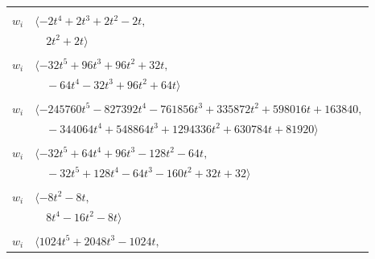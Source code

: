 \documentclass[11pt]{article}
\begin{document}
\begin{longtable}{@{}ll@{}}
\addlinespace[2pt]
\multicolumn{2}{@{}p{0.97\textwidth}@{}}{$i=11$, $D_i=2$, $\rho_{ij}$: $16{:}1, \allowbreak 17{:}2, \allowbreak 19{:}2, \allowbreak 29{:}1, \allowbreak 40{:}1, \allowbreak 43{:}2$}\\
$w_i$ & $\langle -2t^{4}+2t^{3}+2t^{2}-2t,$\\
 & $\quad 2t^{2}+2t\rangle$\\
\addlinespace[2pt]
\multicolumn{2}{@{}p{0.97\textwidth}@{}}{$i=12$, $D_i=32$, $\rho_{ij}$: $0{:}1, \allowbreak 1{:}1, \allowbreak 17{:}2, \allowbreak 28{:}1, \allowbreak 34{:}2, \allowbreak 47{:}1$}\\
$w_i$ & $\langle -32t^{5}+96t^{3}+96t^{2}+32t,$\\
 & $\quad -64t^{4}-32t^{3}+96t^{2}+64t\rangle$\\
\addlinespace[2pt]
\multicolumn{2}{@{}p{0.97\textwidth}@{}}{$i=13$, $D_i=8192$, $\rho_{ij}$: $0{:}1, \allowbreak 4{:}1, \allowbreak 14{:}2, \allowbreak 21{:}2, \allowbreak 24{:}2, \allowbreak 26{:}2, \allowbreak 30{:}2, \allowbreak 32{:}1, \allowbreak 35{:}2, \allowbreak 36{:}1, \allowbreak 37{:}2, \allowbreak 42{:}1, \allowbreak 44{:}1$}\\
$w_i$ & $\langle -245760t^{5}-827392t^{4}-761856t^{3}+335872t^{2}+598016t+163840,$\\
 & $\quad -344064t^{4}+548864t^{3}+1294336t^{2}+630784t+81920\rangle$\\
\addlinespace[2pt]
\multicolumn{2}{@{}p{0.97\textwidth}@{}}{$i=14$, $D_i=32$, $\rho_{ij}$: $5{:}1, \allowbreak 13{:}1, \allowbreak 20{:}1, \allowbreak 26{:}1, \allowbreak 27{:}1, \allowbreak 34{:}2, \allowbreak 45{:}2$}\\
$w_i$ & $\langle -32t^{5}+64t^{4}+96t^{3}-128t^{2}-64t,$\\
 & $\quad -32t^{5}+128t^{4}-64t^{3}-160t^{2}+32t+32\rangle$\\
\addlinespace[2pt]
\multicolumn{2}{@{}p{0.97\textwidth}@{}}{$i=15$, $D_i=8$, $\rho_{ij}$: $4{:}2, \allowbreak 32{:}1, \allowbreak 35{:}1, \allowbreak 38{:}2, \allowbreak 43{:}1, \allowbreak 45{:}1$}\\
$w_i$ & $\langle -8t^{2}-8t,$\\
 & $\quad 8t^{4}-16t^{2}-8t\rangle$\\
\addlinespace[2pt]
\multicolumn{2}{@{}p{0.97\textwidth}@{}}{$i=16$, $D_i=512$, $\rho_{ij}$: $2{:}2, \allowbreak 6{:}1, \allowbreak 8{:}1, \allowbreak 11{:}2, \allowbreak 17{:}2, \allowbreak 18{:}1, \allowbreak 30{:}2, \allowbreak 31{:}1, \allowbreak 48{:}1$}\\
$w_i$ & $\langle 1024t^{5}+2048t^{3}-1024t,$\\

\end{longtable}
\end{document}

